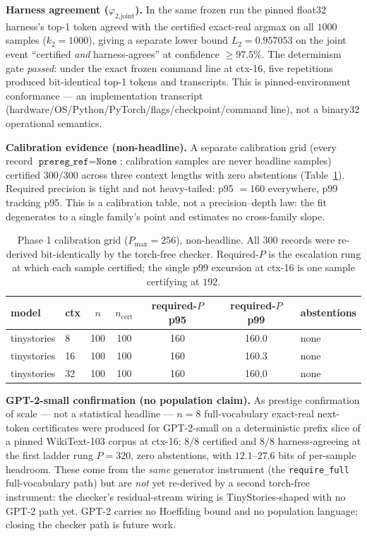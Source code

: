 \documentclass[11pt,a4paper]{article}
\begin{document}
\textbf{Harness agreement (\(\varphi_{2\text{,joint}}\)).} In the same frozen run the pinned float32 harness's top-1 token agreed with the certified exact-real argmax on all \(1000\) samples (\(k_2 = 1000\)), giving a separate lower bound \(L_2 = 0.957053\) on the joint event ``certified \emph{and} harness-agrees'' at confidence \(\ge 97.5\%\). The determinism gate \emph{passed}: under the exact frozen command line at ctx-16, five repetitions produced bit-identical top-1 tokens and transcripts. This is pinned-environment conformance --- an implementation transcript (hardware/OS/Python/PyTorch/flags/checkpoint/command line), not a binary32 operational semantics.

\textbf{Calibration evidence (non-headline).} A separate calibration grid (every record \(\texttt{prereg\_ref} = \texttt{None}\); calibration samples are never headline samples) certified \(300/300\) across three context lengths with zero abstentions (Table~\ref{tab:calib}). Required precision is tight and not heavy-tailed: p95 \(= 160\) everywhere, p99 tracking p95. This is a calibration table, not a precision--depth law: the fit degenerates to a single family's point and estimates no cross-family slope.

\begin{table}[h]
\centering
\small
\begin{tabular}{@{}llccccl@{}}
\toprule
model & ctx & \(n\) & \(n_{\text{cert}}\) & required-\(P\) p95 & required-\(P\) p99 & abstentions \\
\midrule
tinystories & 8  & 100 & 100 & 160 & 160.0 & none \\
tinystories & 16 & 100 & 100 & 160 & 160.3 & none \\
tinystories & 32 & 100 & 100 & 160 & 160.0 & none \\
\bottomrule
\end{tabular}
\caption{Phase 1 calibration grid (\(P_{\max}=256\)), non-headline. All \(300\) records were re-derived bit-identically by the torch-free checker. Required-\(P\) is the escalation rung at which each sample certified; the single p99 excursion at ctx-16 is one sample certifying at \(192\).}
\label{tab:calib}
\end{table}

\textbf{GPT-2-small confirmation (no population claim).} As prestige confirmation of scale --- not a statistical headline --- \(n = 8\) full-vocabulary exact-real next-token certificates were produced for GPT-2-small on a deterministic prefix slice of a pinned WikiText-103 corpus at ctx-16: \(8/8\) certified and \(8/8\) harness-agreeing at the first ladder rung \(P = 320\), zero abstentions, with \(12.1\text{--}27.6\) bits of per-sample headroom. These come from the \emph{same} generator instrument (the \texttt{require\_full} full-vocabulary path) but are \emph{not} yet re-derived by a second torch-free instrument: the checker's residual-stream wiring is TinyStories-shaped with no GPT-2 path yet. GPT-2 carries no Hoeffding bound and no population language; closing the checker path is future work.
\end{document}
